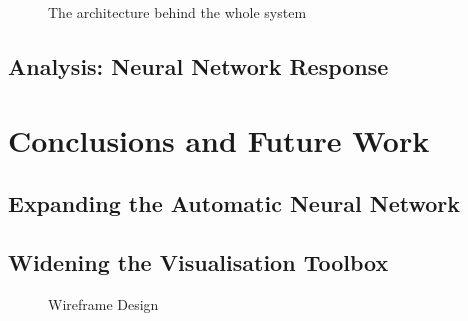 \documentclass[a4paper,11pt,titlepage]{article}
\begin{document}
		
	\begin{figure}[H]
    			\caption{The architecture behind the whole system}%
	\end{figure}	
	
	
	\subsection{Analysis: Neural Network Response}
	
\section{Conclusions and Future Work}
	\subsection{Expanding the Automatic Neural Network}		
	\subsection{Widening the Visualisation Toolbox}
	
	\begin{figure}[H]
    			\caption{Wireframe Design}%
	\end{figure}	
	
\end{document}
